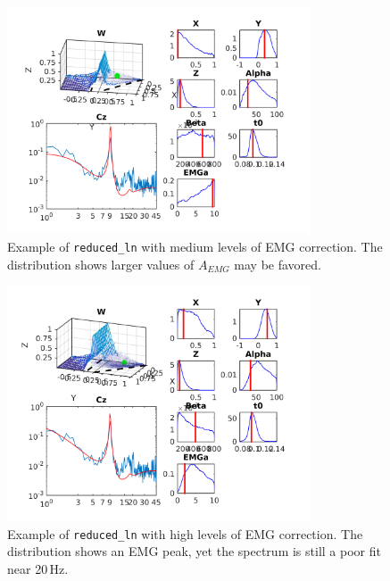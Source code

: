 \documentclass[10pt,a4paper]{article}
\begin{document}
\begin{figure}[h!]
\begin{center}
\includegraphics[width=0.8\textwidth]{example_reduced_ln_emg_low}
\caption{Example of \texttt{reduced\_ln} with medium levels of EMG correction. The distribution shows larger values of $A_{EMG}$ may be favored. }
\label{fig:full}
\end{center}
\end{figure}

\begin{figure}[h!]
\begin{center}
\includegraphics[width=0.8\textwidth]{example_reduced_ln_emg_high}
\caption{Example of \texttt{reduced\_ln} with high levels of EMG correction. The distribution shows an EMG peak, yet the spectrum is still a poor fit near 20\,Hz. }
\label{fig:full}
\end{center}
\end{figure}

\clearpage
\end{document}
